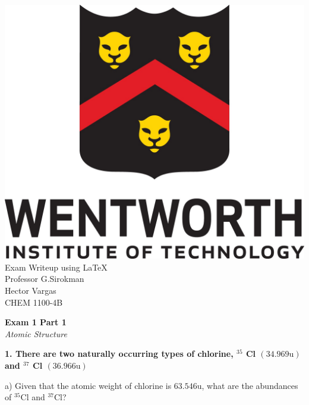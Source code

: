 \documentclass{article}
\begin{document}
    \thispagestyle{empty}
    \begin{center}
        \includegraphics[scale=0.3]{wit_logo}\\[1cm]
        Exam Writeup using  \LaTeX\\
        Professor G.Sirokman\\
        Hector Vargas\\
        CHEM 1100-4B
    \end{center}
    \pagebreak


    \begin{center}
        \textbf{Exam 1 Part 1}\\
        \textit{Atomic Structure}
    \end{center}
    \textbf{1. There are two naturally occurring types of chlorine, ${}^{35}$ Cl $(34.969 \si{\atomicmassunit})$ and ${}^{37}$ Cl $(36.966 \si{\atomicmassunit})$}

    a) Given that the atomic weight of chlorine is $63.546 \si{\atomicmassunit}$, what are the abundances of ${}^{35}$Cl and ${}^{37}$Cl?
\end{document}
